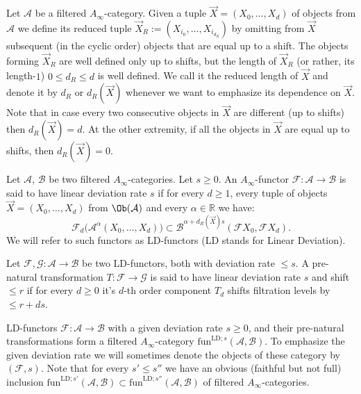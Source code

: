 
Let $\mathcal{A}$ be a filtered $A_{\infty}$-category.  Given a tuple
$\vec{X} = (X_0, \ldots, X_d)$ of objects from $\mathcal{A}$ we define
its reduced tuple $\vec{X}_R := (X_{i_0}, \ldots, X_{i_{d_R}})$ by
omitting from $\vec{X}$ subsequent (in the cyclic order) objects that
are equal up to a shift. The objects forming $\vec{X}_R$ are well
defined only up to shifts, but the length of $\vec{X}_R$ (or rather, its length-$1$)
$0 \leq d_R \leq d$ is well defined. We call it the reduced length of
$\vec{X}$ and denote it by $d_R$ or $d_R(\vec{X})$ whenever we want to
emphasize its dependence on $\vec{X}$. Note that in case every two
consecutive objects in $\vec{X}$ are different (up to shifts) then
$d_R(\vec{X}) = d$. At the other extremity, if all the objects in
$\vec{X}$ are equal up to shifts, then $d_R(\vec{X}) = 0$.

Let $\mathcal{A}$, $\mathcal{B}$ be two filtered
$A_{\infty}$-categories. Let $s\geq 0$. An $A_{\infty}$-functor
$\mathcal{F}: \mathcal{A} \longrightarrow \mathcal{B}$ is said to have
linear deviation rate $s$ if for every $d \geq 1$, every tuple
of objects $\vec{X} = (X_0, \ldots, X_d)$ from $\Ob(\mathcal{A})$ and
every $\alpha \in \mathbb{R}$ we have:
$$\mathcal{F}_d \bigl(\mathcal{A}^{\alpha}(X_0, \ldots, X_d)\bigr)
\subset \mathcal{B}^{\alpha + d_R(\vec{X}) s}(\mathcal{F}X_0,
\mathcal{F}X_d).$$ We will refer to such functors as LD-functors (LD
stands for Linear Deviation).

Let
$\mathcal{F}, \mathcal{G}: \mathcal{A} \longrightarrow \mathcal{B}$ be
two LD-functors, both with deviation rate $\leq s$.  A pre-natural
transformation $T: \mathcal{F} \longrightarrow \mathcal{G}$ is said to
have linear deviation rate $s$ and shift $\leq r$ if for every
$d \geq 0$ it's $d$-th order component $T_d$ shifts filtration levels
by $\leq r + ds$.

LD-functors $\mathcal{F}: \mathcal{A} \longrightarrow \mathcal{B}$
with a given deviation rate $s \geq 0$, and their pre-natural
transformations form a filtered $A_{\infty}$-category
$\text{fun}^{\text{LD};s}(\mathcal{A}, \mathcal{B})$. To emphasize the
given deviation rate we will sometimes denote the objects of these
category by $(\mathcal{F}, s)$. Note that for every $s' \leq s''$ we
have an obvious (faithful but not full) inclusion
$\text{fun}^{\text{LD};s'}(\mathcal{A}, \mathcal{B}) \subset
\text{fun}^{\text{LD};s''}(\mathcal{A}, \mathcal{B})$ of filtered
$A_{\infty}$-categories.

